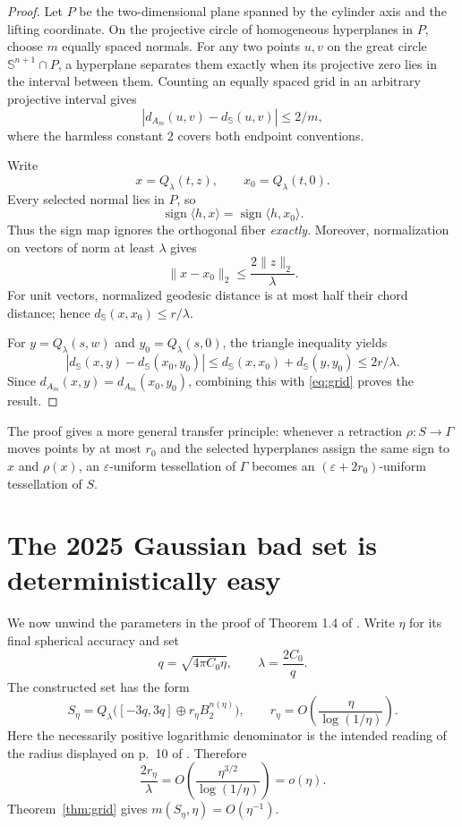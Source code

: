 \documentclass[11pt]{article}
\newcommand{\Sph}{\mathbb S}
\begin{document}
\begin{proof}
Let \(P\) be the two-dimensional plane spanned by the cylinder axis and the
lifting coordinate.  On the projective circle of homogeneous hyperplanes in
\(P\), choose \(m\) equally spaced normals.  For any two points \(u,v\) on
the great circle \(\Sph^{n+1}\cap P\), a hyperplane separates them exactly
when its projective zero lies in the interval between them.  Counting an
equally spaced grid in an arbitrary projective interval gives
\begin{equation}\label{eq:grid}
 |d_{A_m}(u,v)-d_{\Sph}(u,v)|\le 2/m,
\end{equation}
where the harmless constant \(2\) covers both endpoint conventions.

Write
\[
 x=Q_\lambda(t,z),\qquad x_0=Q_\lambda(t,0).
\]
Every selected normal lies in \(P\), so
\[
 \operatorname{sign}\langle h,x\rangle
 =\operatorname{sign}\langle h,x_0\rangle.
\]
Thus the sign map ignores the orthogonal fiber \emph{exactly}.  Moreover,
normalization on vectors of norm at least \(\lambda\) gives
\[
 \|x-x_0\|_2\le \frac{2\|z\|_2}{\lambda}.
\]
For unit vectors, normalized geodesic distance is at most half their chord
distance; hence \(d_{\Sph}(x,x_0)\le r/\lambda\).

For \(y=Q_\lambda(s,w)\) and \(y_0=Q_\lambda(s,0)\), the triangle inequality
yields
\[
 |d_{\Sph}(x,y)-d_{\Sph}(x_0,y_0)|
 \le d_{\Sph}(x,x_0)+d_{\Sph}(y,y_0)
 \le 2r/\lambda.
\]
Since \(d_{A_m}(x,y)=d_{A_m}(x_0,y_0)\), combining this with
\eqref{eq:grid} proves the result.
\end{proof}

The proof gives a more general transfer principle: whenever a retraction
\(\rho:S\to\Gamma\) moves points by at most \(r_0\) and the selected
hyperplanes assign the same sign to \(x\) and \(\rho(x)\), an
\(\varepsilon\)-uniform tessellation of \(\Gamma\) becomes an
\((\varepsilon+2r_0)\)-uniform tessellation of \(S\).

\section*{The 2025 Gaussian bad set is deterministically easy}
We now unwind the parameters in the proof of Theorem 1.4 of \cite{ds}.  Write
\(\eta\) for its final spherical accuracy and set
\[
 q=\sqrt{4\pi C_0\eta},\qquad
 \lambda=\frac{2C_0}{q}.
\]
The constructed set has the form
\[
 S_\eta
 =Q_\lambda\bigl([-3q,3q]\oplus r_\eta B_2^{n(\eta)}\bigr),
 \qquad
 r_\eta=O\!\left(\frac{\eta}{\log(1/\eta)}\right).
\]
Here the necessarily positive logarithmic denominator is the intended
reading of the radius displayed on p.~10 of \cite{ds}.  Therefore
\[
 \frac{2r_\eta}{\lambda}
 =O\!\left(\frac{\eta^{3/2}}{\log(1/\eta)}\right)=o(\eta).
\]
Theorem~\ref{thm:grid} gives \(m(S_\eta,\eta)=O(\eta^{-1})\).
\end{document}
